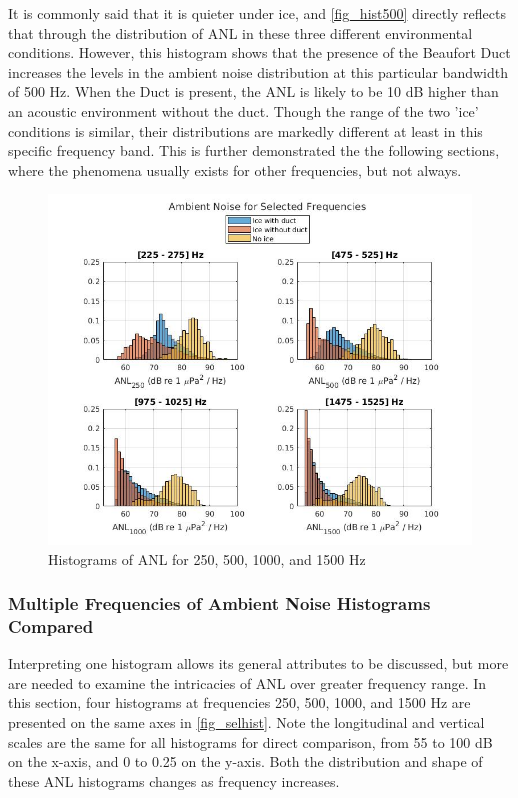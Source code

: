 It is commonly said that it is quieter under ice, and \autoref{fig_hist500} directly reflects that through the distribution of ANL in these three different environmental conditions. However, this histogram shows that the presence of the Beaufort Duct increases the levels in the ambient noise distribution at this particular bandwidth of 500 Hz. When the Duct is present, the ANL is likely to be 10 dB higher than an acoustic environment without the duct. Though the range of the two 'ice' conditions is similar, their distributions are markedly different at least in this specific frequency band. This is further demonstrated the the following sections, where the phenomena usually exists for other frequencies, but not always. %


\begin{figure}[h]
\centering
\includegraphics[scale=0.5]{Figures/selected_hists2.jpg}
\caption{Histograms of ANL for 250, 500, 1000, and 1500 Hz}
\label{fig_selhist}
\end{figure}

\subsubsection{Multiple Frequencies of Ambient Noise Histograms Compared}
Interpreting one histogram allows its general attributes to be discussed, but more are needed to examine the intricacies of ANL over greater frequency range. In this section, four histograms at frequencies 250, 500, 1000, and 1500 Hz are presented on the same axes in \autoref{fig_selhist}. Note the longitudinal and vertical scales are the same for all histograms for direct comparison, from 55 to 100 dB on the x-axis, and 0 to 0.25 on the y-axis. Both the distribution and shape of these ANL histograms changes as frequency increases. 


